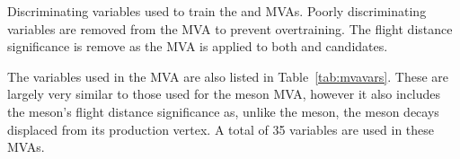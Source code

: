 \begin{table}[h]
   \caption{Discriminating variables used to train the \phiz and \Dsp MVAs. Poorly discriminating variables are removed from the \phiz MVA to prevent overtraining. The flight distance significance is remove as the MVA is applied to both \phiz and \Dzb candidates.}
   \label{tab:mvavars}
\end{table}
 
The variables used in the \Dsp MVA are also listed in Table~\ref{tab:mvavars}. These are largely very similar to those used for the \phiz meson MVA, however it also includes the \Dsp meson's flight distance significance as, unlike the \phiz meson, the \Dsp meson decays displaced from its production vertex. A total of 35 variables are used in these MVAs.




